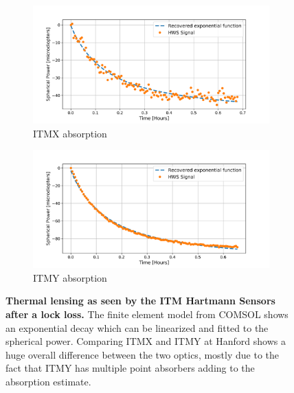 \begin{figure}[ht]
\centering
	\begin{subfigure}[a]{0.7\textwidth}
		\centering
		\includegraphics[width=\textwidth]{../Figures/MCMC_ITMX_ABS_FIT.png}
		\caption{ITMX absorption}
		\label{fig:itmx_abs}
	\end{subfigure}
\hfill
	\begin{subfigure}[b]{0.7\textwidth}
		\centering
		\includegraphics[width=\textwidth]{../Figures/MCMC_ITMY_ABS_FIT.png}
		\caption{ITMY absorption}
		\label{fig:itmy_abs}
	\end{subfigure}
	\caption[Thermal lensing as seen by the ITM Hartmann Sensors after a lock loss.]  
	{\textbf{Thermal lensing as seen by the ITM Hartmann Sensors after a lock loss.} The finite element model from COMSOL shows an exponential decay which can be linearized and fitted to the spherical power. Comparing ITMX and ITMY at Hanford shows a huge overall difference between the two optics, mostly due to the fact that ITMY has multiple point absorbers adding to the absorption estimate.}
\label{fig:hws_abs}
\end{figure}

